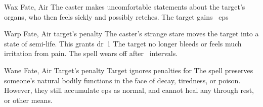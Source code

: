 \ifodd\value{diceNo}
  {}%
  {Wax}%
  {Fate, Air}%
  {}%
  {The caster makes uncomfortable statements about the target's organs, who then feels sickly and possibly retches.
  The target gains ~\glspl{ep}}%
  {}

\else

  {}%
  {Warp}%
  {Fate, Air}%
  {target's  penalty}%
  {The caster's strange stare moves the target into a state of semi-life.
  This grants \gls{dr}~1}%
  {
    The target no longer bleeds or feels much irritation from pain.
    The spell wears off after ~\glspl{interval}.}

  {}%
  {Wane}%
  {Fate, Air}%
  {Target's  penalty}%
  {Target ignores   penalties for }%
  {The spell preserves someone's natural bodily functions in the face of decay, tiredness, or poison.
    However, they still accumulate \glspl{ep} as normal, and cannot heal any through rest, or other means.}

\fi
{}
